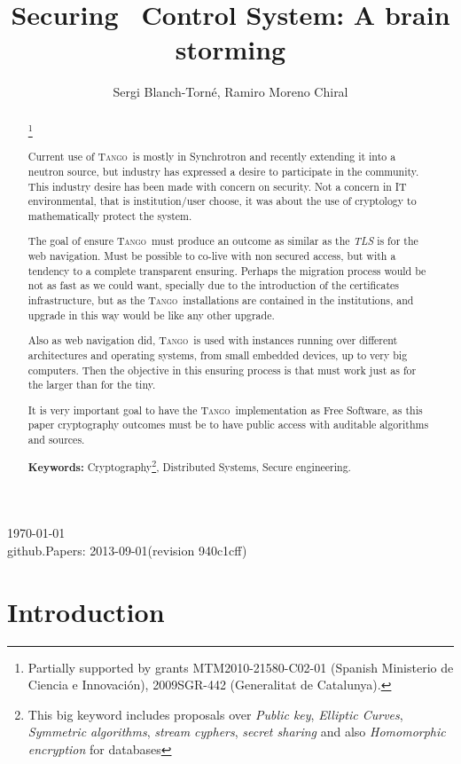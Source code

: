 \documentclass[10pt,a4paper,twoside]{llncs}
\title{Securing \tango\, Control System: A brain storming}
\author{Sergi Blanch-Torn\'e\inst{1}, Ramiro Moreno Chiral\inst{2}}
\institute{
 Escola Polit\`ecnica Superior, Universitat de Lleida. Spain.\\
 \email{\tt sblanch@alumnes.udl.es}
 \and 
 Departament de Matem\`atica. Universitat de Lleida. Spain.\\
 \email{\tt ramiro@matematica.udl.es}
 }
\newcommand{\version}{github.Papers: 2013-09-01\;(revision 940c1cff) } %
\newcommand{\tango}{\textsc{Tango}}
\begin{document}
\maketitle
\begin{center}
 \today\\
 \version
\end{center}


\begin{abstract}\footnote{Partially supported by grants MTM2010-21580-C02-01 (Spanish Ministerio de Ciencia e Innovaci\'on), 2009SGR-442 (Generalitat de Catalunya).}

Current use of \tango\, is mostly in Synchrotron and recently extending it into a neutron source, but industry has expressed a desire to participate in the community. This industry desire has been made with concern on security. Not a concern in IT environmental, that is institution/user choose, it was about the use of cryptology to mathematically protect the system.

The goal of ensure \tango\, must produce an outcome as similar as the \emph{TLS} is for the web navigation. Must be possible to co-live with non secured access, but with a tendency to a complete transparent ensuring. Perhaps the migration process would be not as fast as we could want, specially due to the introduction of the certificates infrastructure, but as the \tango\, installations are contained in the institutions, and upgrade in this way would be like any other upgrade.

Also as web navigation did, \tango\, is used with instances running over different architectures and operating systems, from small embedded devices, up to very big computers. Then the objective in this ensuring process is that must work just as for the larger than for the tiny.

It is very important goal to have the \tango\, implementation as Free Software, as this paper cryptography outcomes must be to have public access with auditable algorithms and sources.
   
{\bf Keywords:} Cryptography\footnote{This big keyword includes proposals over \emph{Public key}, \emph{Elliptic Curves}, \emph{Symmetric algorithms}, \emph{stream cyphers}, \emph{secret sharing} and also \emph{Homomorphic encryption} for databases}, Distributed Systems, Secure engineering.

\end{abstract}

%
\section{Introduction \label{sec:introduction}}
\end{document}
